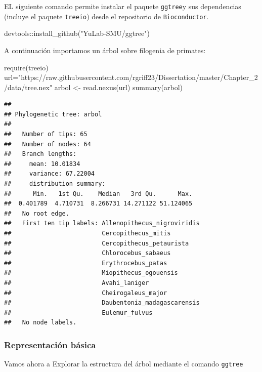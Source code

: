 \documentclass[
]{article}
\newenvironment{Shaded}{\begin{snugshade}}{\end{snugshade}}
\newcommand{\FunctionTok}[1]{\textcolor[rgb]{0.00,0.00,0.00}{#1}}
\newcommand{\NormalTok}[1]{#1}
\newcommand{\OtherTok}[1]{\textcolor[rgb]{0.56,0.35,0.01}{#1}}
\newcommand{\SpecialCharTok}[1]{\textcolor[rgb]{0.00,0.00,0.00}{#1}}
\newcommand{\StringTok}[1]{\textcolor[rgb]{0.31,0.60,0.02}{#1}}
\numberwithin{ejcnt}{section}
\begin{document}
EL siguiente comando permite instalar el paquete \texttt{ggtree}y sus dependencias (incluye el paquete \texttt{treeio}) desde el repositorio de \texttt{Bioconductor}.

\begin{Shaded}
\begin{Highlighting}[]
\NormalTok{devtools}\SpecialCharTok{::}\FunctionTok{install\_github}\NormalTok{(}\StringTok{"YuLab{-}SMU/ggtree"}\NormalTok{)}
\end{Highlighting}
\end{Shaded}

A continuación importamos un árbol sobre filogenia de primates:

\begin{Shaded}
\begin{Highlighting}[]
\FunctionTok{require}\NormalTok{(treeio) }
\NormalTok{url}\OtherTok{=}\StringTok{"https://raw.githubusercontent.com/rgriff23/Dissertation/master/Chapter\_2/data/tree.nex"}
\NormalTok{arbol }\OtherTok{\textless{}{-}} \FunctionTok{read.nexus}\NormalTok{(url)}
\FunctionTok{summary}\NormalTok{(arbol)}
\end{Highlighting}
\end{Shaded}

\begin{verbatim}
## 
## Phylogenetic tree: arbol 
## 
##   Number of tips: 65 
##   Number of nodes: 64 
##   Branch lengths:
##     mean: 10.01834 
##     variance: 67.22004 
##     distribution summary:
##      Min.   1st Qu.    Median   3rd Qu.      Max. 
##  0.401789  4.710731  8.266731 14.271122 51.124065 
##   No root edge.
##   First ten tip labels: Allenopithecus_nigroviridis 
##                         Cercopithecus_mitis
##                         Cercopithecus_petaurista
##                         Chlorocebus_sabaeus
##                         Erythrocebus_patas
##                         Miopithecus_ogouensis
##                         Avahi_laniger
##                         Cheirogaleus_major
##                         Daubentonia_madagascarensis
##                         Eulemur_fulvus
##   No node labels.
\end{verbatim}

\hypertarget{representaciuxf3n-buxe1sica}{%
\subsubsection{Representación básica}\label{representaciuxf3n-buxe1sica}}

Vamos ahora a Explorar la estructura del árbol mediante el comando \texttt{ggtree}
\end{document}
